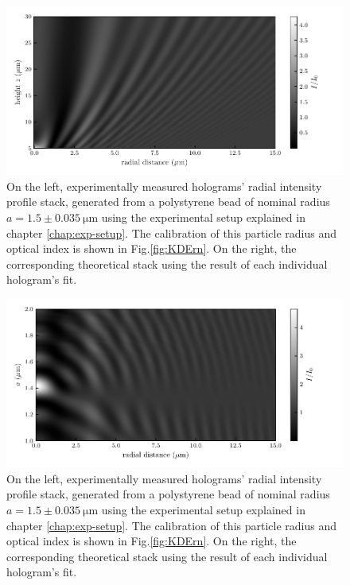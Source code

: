 \begin{figure}
	\centering
	\includegraphics{02_body/chapter2/images/holo_size_exemple/holos_only_z.pdf}
	\caption{On the left, experimentally measured  holograms' radial intensity profile stack, generated from a polystyrene bead of nominal radius $a = 1.5 \pm 0.035 ~ \mathrm{\mu m} $ using the experimental setup explained in chapter \ref{chap:exp-setup}. The calibration of this particle radius and optical index is shown in Fig.\ref{fig:KDErn}. On the right, the corresponding theoretical stack using the result of each individual hologram's fit.}
	\label{fig:holo_onlyz}
\end{figure}


\begin{figure}
	\centering
	\includegraphics{02_body/chapter2/images/holo_size_exemple/holos_only_n.pdf}
	\caption{On the left, experimentally measured  holograms' radial intensity profile stack, generated from a polystyrene bead of nominal radius $a = 1.5 \pm 0.035 ~ \mathrm{\mu m} $ using the experimental setup explained in chapter \ref{chap:exp-setup}. The calibration of this particle radius and optical index is shown in Fig.\ref{fig:KDErn}. On the right, the corresponding theoretical stack using the result of each individual hologram's fit.}
	\label{fig:holo_onlyn}
\end{figure}


